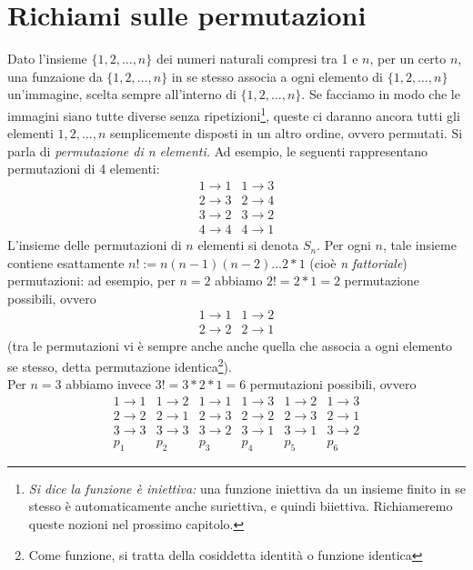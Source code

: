 \documentclass{book}
\begin{document}
\section {Richiami sulle permutazioni \label{ricsullperm}}
Dato l'insieme $\{1,2,\dots,n\}$ dei numeri naturali compresi tra 1 e $n$, per un certo $n$, una funzaione da $\{1,2,\dots,n\}$ in se stesso associa a ogni elemento di $\{1,2,\dots,n\}$ un'immagine, scelta sempre all'interno di $\{1,2,\dots,n\}$. Se facciamo in modo che le immagini siano tutte diverse senza ripetizioni\footnote{\textit{Si dice la funzione è iniettiva:} una funzione iniettiva da un insieme finito in se stesso è automaticamente anche suriettiva, e quindi biiettiva. Richiameremo queste nozioni nel prossimo capitolo.}, queste ci daranno ancora tutti gli elementi $1,2,\dots,n$ semplicemente disposti in un altro ordine, ovvero permutati. Si parla di {\em permutazione di n elementi.} Ad esempio, le seguenti rappresentano permutazioni di 4 elementi:
\begin{equation*}
  \begin{matrix}
    1 \to 1 & 1 \to 3\\
    2 \to 3 & 2 \to 4\\
    3 \to 2 & 3 \to 2\\
    4 \to 4 & 4 \to 1
  \end{matrix}
\end{equation*}
L'insieme delle permutazioni di $n$ elementi si denota $S_n$. Per ogni $n$, tale insieme contiene esattamente $n!:=n(n-1)(n-2)\dots 2*1$ (cioè {\it n fattoriale}) permutazioni: ad esempio, per $n = 2$ abbiamo $2!= 2 * 1 = 2$ permutazione possibili, ovvero
\begin{equation*}
  \begin{matrix}
    1 \to 1 & 1 \to 2\\
    2 \to 2 & 2 \to 1
  \end{matrix}
\end{equation*}
(tra le permutazioni vi è sempre anche anche quella che associa a ogni elemento se stesso, detta permutazione identica\footnote{Come funzione, si tratta della cosiddetta identità o funzione identica}).\\
Per $n=3$ abbiamo invece $3!=3*2*1=6$ permutazioni possibili, ovvero
\begin{equation*}
  \begin{matrix}
    1 \to 1 & 1 \to 2 & 1 \to 1 & 1 \to 3 & 1 \to 2 & 1 \to 3 \\
    2 \to 2 & 2 \to 1 & 2 \to 3 & 2 \to 2 & 2 \to 3 & 2 \to 1 \\
    3 \to 3 & 3 \to 3 & 3 \to 2 & 3 \to 1 & 3 \to 1 & 3 \to 2 \\
      p_1   &    p_2   &   p_3   &    p_4  &    p_5  &    p_6
  \end{matrix}
\end{equation*}
\end{document}
